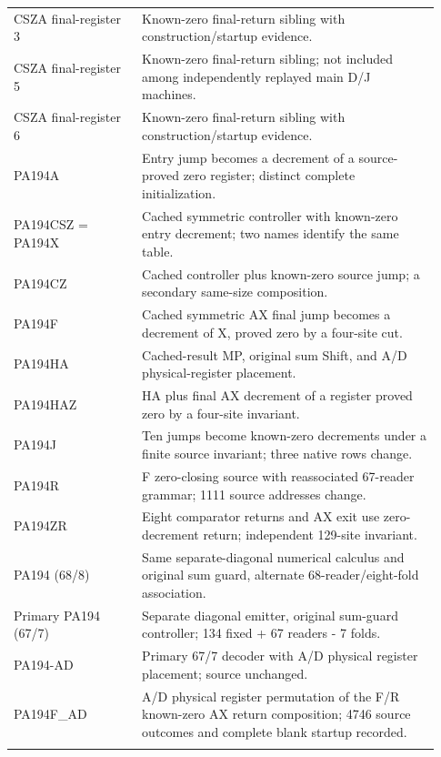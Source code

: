 \begin{longtable}{>{\raggedright\arraybackslash}p{0.28\linewidth}>{\raggedright\arraybackslash}p{0.65\linewidth}}
CSZA final-register 3 & Known-zero final-return sibling with construction/\allowbreak{}startup evidence.\\\addlinespace[4pt]
CSZA final-register 5 & Known-zero final-return sibling; not included among independently replayed main D/\allowbreak{}J machines.\\\addlinespace[4pt]
CSZA final-register 6 & Known-zero final-return sibling with construction/\allowbreak{}startup evidence.\\\addlinespace[4pt]
PA194A & Entry jump becomes a decrement of a source-proved zero register; distinct complete initialization.\\\addlinespace[4pt]
PA194CSZ = PA194X & Cached symmetric controller with known-zero entry decrement; two names identify the same table.\\\addlinespace[4pt]
PA194CZ & Cached controller plus known-zero source jump; a secondary same-size composition.\\\addlinespace[4pt]
PA194F & Cached symmetric AX final jump becomes a decrement of X, proved zero by a four-site cut.\\\addlinespace[4pt]
PA194HA & Cached-result MP, original sum Shift, and A/\allowbreak{}D physical-register placement.\\\addlinespace[4pt]
PA194HAZ & HA plus final AX decrement of a register proved zero by a four-site invariant.\\\addlinespace[4pt]
PA194J & Ten jumps become known-zero decrements under a finite source invariant; three native rows change.\\\addlinespace[4pt]
PA194R & F zero-closing source with reassociated 67-reader grammar; 1111 source addresses change.\\\addlinespace[4pt]
PA194ZR & Eight comparator returns and AX exit use zero-decrement return; independent 129-site invariant.\\\addlinespace[4pt]
PA194 (68/\allowbreak{}8) & Same separate-diagonal numerical calculus and original sum guard, alternate 68-reader/\allowbreak{}eight-fold association.\\\addlinespace[4pt]
Primary PA194 (67/\allowbreak{}7) & Separate diagonal emitter, original sum-guard controller; 134 fixed + 67 readers - 7 folds.\\\addlinespace[4pt]
PA194-AD & Primary 67/\allowbreak{}7 decoder with A/\allowbreak{}D physical register placement; source unchanged.\\\addlinespace[4pt]
PA194F\_AD & A/\allowbreak{}D physical register permutation of the F/\allowbreak{}R known-zero AX return composition; 4746 source outcomes and complete blank startup recorded.\\\addlinespace[4pt]

\end{longtable}
